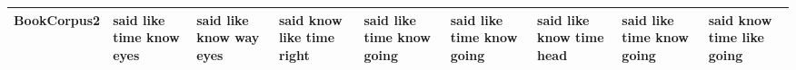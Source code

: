 \documentclass[11pt,a4paper]{article}
\begin{document}
\begin{appendices}
\begin{table}[htp]
\begin{tiny}
\begin{tabular}{|p{}|p{}|p{}|p{}|p{}|p{}|p{}|p{}|p{}|}
BookCorpus2 & said \newline like \newline time \newline know \newline eyes & said \newline like \newline know \newline way \newline eyes & said \newline know \newline like \newline time \newline right & said \newline like \newline time \newline know \newline going & said \newline like \newline time \newline know \newline going & said \newline like \newline know \newline time \newline head & said \newline like \newline time \newline know \newline going & said \newline know \newline time \newline like \newline going\\\hline

\end{tabular}
\end{tiny}
\end{table}
\end{appendices}
\end{document}
